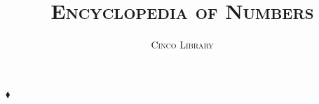 \documentclass[12pt]{book}
\title{\textsc{Encyclopedia of Numbers}}
\author{\textsc{Cinco Library}}
\date{ }
\begin{document}
\frontmatter

\maketitle


\newpage
\cleardoublepage

\mainmatter


$\blacklozenge$
\end{document}
